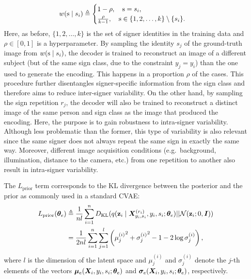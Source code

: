\begin{equation}
    w({\textnormal{s}} \mid s_{i}) \triangleq
    \begin{cases}
        1-\rho, \quad {\textnormal{s}}=s_{i}, \\
        \frac{\rho}{k-1}, \quad {\textnormal{s}} \in \lbrace 1,2,\dots,k \rbrace \setminus \lbrace s_{i} \rbrace.
    \end{cases}
\end{equation}
Here, as before, $\lbrace 1,2,\dots,k \rbrace$ is the set of signer identities in the training data and $\rho \in [0, 1]$ is a hyperparameter. By sampling the identity $s_{j}$ of the ground-truth image from $w({\textnormal{s}} \mid s_{i})$, the decoder is trained to reconstruct an image of a different subject (but of the same sign class, due to the constraint $y_j=y_i$) than the one used to generate the encoding. This happens in a proportion $\rho$ of the cases. This procedure further disentangles signer-specific information from the sign class and therefore aims to reduce inter-signer variability. On the other hand, by sampling the sign repetition $r_{j}$, the decoder will also be trained to reconstruct a distinct image of the same person and sign class as the image that produced the encoding. Here, the purpose is to gain robustness to intra-signer variability. Although less problematic than the former, this type of variability is also relevant since the same signer does not always repeat the same sign in exactly the same way. Moreover, different image acquisition conditions (e.g.\ background, illumination, distance to the camera, etc.) from one repetition to another also result in intra-signer variability.

The $L_{\text{prior}}$ term corresponds to the KL divergence between the posterior and the prior as commonly used in a standard CVAE:
\begin{align}
    \label{eq:loss_prior}
    L_{\text{prior}}({\bm{\theta}}_{e}) &\triangleq \frac{1}{nl} \sum_{i=1}^n D_{\mathrm{KL}}(q({\mathbf{z}}_{i} \mid {\bm{X}}^{(r_{i})}_{y_{i},s_{i}}, y_{i}, s_{i}; {\bm{\theta}}_e) || {\mathcal{N}}({\mathbf{z}}_{i}; 0, {\bm{I}})) \nonumber\\
    &= \frac{1}{2nl} \sum_{i=1}^n \sum_{j=1}^l \left({\mu^{(i)}_j}^2 + {\sigma^{(i)}_j}^2 -1 - 2\log {\sigma^{(i)}_j}\right),
\end{align}
where $l$ is the dimension of the latent space and $\mu^{(i)}_j$ and $\sigma^{(i)}_j$ denote the $j$-th elements of the vectors ${\bm{\mu}}_{e}({\bm{X}}_i, y_i, s_i; {\bm{\theta}}_e)$ and ${\bm{\sigma}}_{e}({\bm{X}}_i, y_i, s_i; {\bm{\theta}}_e)$, respectively.

